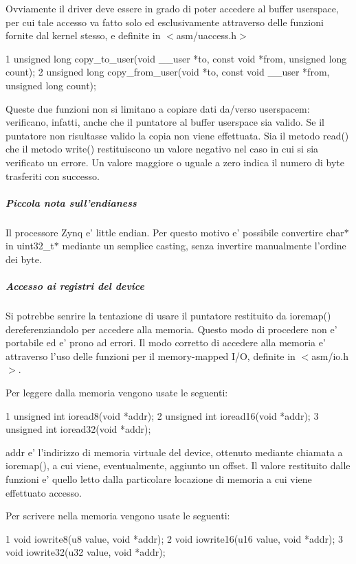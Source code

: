 Ovviamente il driver deve essere in grado di poter accedere al buffer userspace, per cui tale accesso va fatto solo ed esclusivamente attraverso delle funzioni fornite dal kernel stesso, e definite in $<$asm/uaccess.\+h$>$ 
\begin{DoxyCode}
1 unsigned long copy\_to\_user(void \_\_user *to, const void *from, unsigned long count);
2 unsigned long copy\_from\_user(void *to, const void \_\_user *from, unsigned long count);
\end{DoxyCode}
 Queste due funzioni non si limitano a copiare dati da/verso userspacem\+: verificano, infatti, anche che il puntatore al buffer userspace sia valido. Se il puntatore non risultasse valido la copia non viene effettuata. Sia il metodo read() che il metodo write() restituiscono un valore negativo nel caso in cui si sia verificato un errore. Un valore maggiore o uguale a zero indica il numero di byte trasferiti con successo.

\subparagraph*{Piccola nota sull'endianess}

Il processore Zynq e' little endian. Per questo motivo e' possibile convertire char$\ast$ in uint32\+\_\+t$\ast$ mediante un semplice casting, senza invertire manualmente l'ordine dei byte.

\subparagraph*{Accesso ai registri del device}

Si potrebbe senrire la tentazione di usare il puntatore restituito da ioremap() dereferenziandolo per accedere alla memoria. Questo modo di procedere non e' portabile ed e' prono ad errori. Il modo corretto di accedere alla memoria e' attraverso l'uso delle funzioni per il memory-\/mapped I/\+O, definite in $<$asm/io.\+h$>$.

Per leggere dalla memoria vengono usate le seguenti\+:


\begin{DoxyCode}
1 unsigned int ioread8(void *addr);
2 unsigned int ioread16(void *addr);
3 unsigned int ioread32(void *addr);
\end{DoxyCode}


addr e' l'indirizzo di memoria virtuale del device, ottenuto mediante chiamata a ioremap(), a cui viene, eventualmente, aggiunto un offset. Il valore restituito dalle funzioni e' quello letto dalla particolare locazione di memoria a cui viene effettuato accesso.

Per scrivere nella memoria vengono usate le seguenti\+:


\begin{DoxyCode}
1 void iowrite8(u8 value, void *addr);
2 void iowrite16(u16 value, void *addr);
3 void iowrite32(u32 value, void *addr);
\end{DoxyCode}


